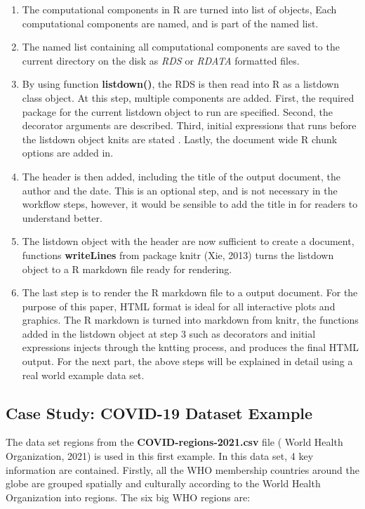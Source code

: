 \documentclass[
]{article}
\begin{document}
\begin{enumerate}
\def\labelenumi{\arabic{enumi}.}
\item
  The computational components in R are turned into list of objects,
  Each computational components are named, and is part of the named
  list.
\item
  The named list containing all computational components are saved to
  the current directory on the disk as \emph{RDS} or \emph{RDATA}
  formatted files.
\item
  By using function \textbf{listdown()}, the RDS is then read into R as
  a listdown class object. At this step, multiple components are added.
  First, the required package for the current listdown object to run are
  specified. Second, the decorator arguments are described. Third,
  initial expressions that runs before the listdown object knits are
  stated . Lastly, the document wide R chunk options are added in.
\item
  The header is then added, including the title of the output document,
  the author and the date. This is an optional step, and is not
  necessary in the workflow steps, however, it would be sensible to add
  the title in for readers to understand better.
\item
  The listdown object with the header are now sufficient to create a
  document, functions \textbf{writeLines} from package knitr (Xie, 2013)
  turns the listdown object to a R markdown file ready for rendering.
\item
  The last step is to render the R markdown file to a output document.
  For the purpose of this paper, HTML format is ideal for all
  interactive plots and graphics. The R markdown is turned into markdown
  from knitr, the functions added in the listdown object at step 3 such
  as decorators and initial expressions injects through the kntting
  process, and produces the final HTML output. For the next part, the
  above steps will be explained in detail using a real world example
  data set.
\end{enumerate}

\hypertarget{case-study-covid-19-dataset-example}{%
\subsection{Case Study: COVID-19 Dataset
Example}\label{case-study-covid-19-dataset-example}}

The data set regions from the \textbf{COVID-regions-2021.csv} file (
World Health Organization, 2021) is used in this first example. In this
data set, 4 key information are contained. Firstly, all the WHO
membership countries around the globe are grouped spatially and
culturally according to the World Health Organization into regions. The
six big WHO regions are:
\end{document}
